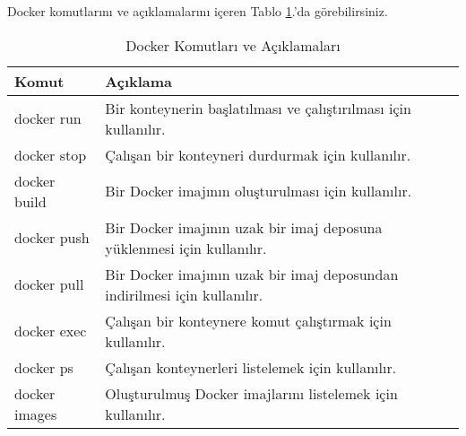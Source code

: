 Docker komutlarını ve açıklamalarını içeren Tablo \ref{tab:docker-komutlar}.'da görebilirsiniz.
\begin{table}[h]
  \centering
  \caption{Docker Komutları ve Açıklamaları}
  \label{tab:docker-komutlar}
  \begin{tabular}{|p{}|p{}|}
  \hline
  \textbf{Komut} & \textbf{Açıklama} \\ \hline
  docker run & Bir konteynerin başlatılması ve çalıştırılması için kullanılır. \\ \hline
  docker stop & Çalışan bir konteyneri durdurmak için kullanılır. \\ \hline
  docker build & Bir Docker imajının oluşturulması için kullanılır. \\ \hline
  docker push & Bir Docker imajının uzak bir imaj deposuna yüklenmesi için kullanılır. \\ \hline
  docker pull & Bir Docker imajının uzak bir imaj deposundan indirilmesi için kullanılır. \\ \hline
  docker exec & Çalışan bir konteynere komut çalıştırmak için kullanılır. \\ \hline
  docker ps & Çalışan konteynerleri listelemek için kullanılır. \\ \hline
  docker images & Oluşturulmuş Docker imajlarını listelemek için kullanılır. \\ \hline
  \end{tabular}
\end{table}
